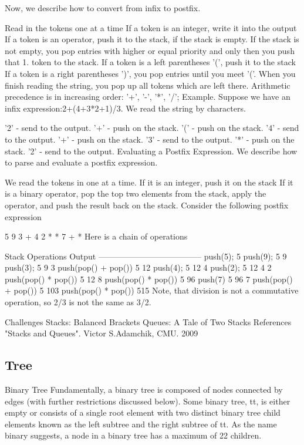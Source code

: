 Now, we describe how to convert from infix to postfix.

Read in the tokens one at a time
If a token is an integer, write it into the output
If a token is an operator, push it to the stack, if the stack is empty. If the stack is not empty, you pop entries with higher or equal priority and only then you push that 1. token to the stack.
If a token is a left parentheses '(', push it to the stack
If a token is a right parentheses ')', you pop entries until you meet '('.
When you finish reading the string, you pop up all tokens which are left there.
Arithmetic precedence is in increasing order: '+', '-', '*', '/';
Example. Suppose we have an infix expression:2+(4+3*2+1)/3. We read the string by characters.

'2' - send to the output.
'+' - push on the stack.
'(' - push on the stack.
'4' - send to the output.
'+' - push on the stack.
'3' - send to the output.
'*' - push on the stack.
'2' - send to the output.
Evaluating a Postfix Expression. We describe how to parse and evaluate a postfix expression.

We read the tokens in one at a time.
If it is an integer, push it on the stack
If it is a binary operator, pop the top two elements from the stack, apply the operator, and push the result back on the stack.
Consider the following postfix expression

5 9 3 + 4 2 * * 7 + *
Here is a chain of operations

Stack Operations              Output
--------------------------------------
push(5);                        5
push(9);                        5 9
push(3);                        5 9 3
push(pop() + pop())             5 12
push(4);                        5 12 4
push(2);                        5 12 4 2
push(pop() * pop())             5 12 8
push(pop() * pop())             5 96
push(7)                         5 96 7
push(pop() + pop())             5 103
push(pop() * pop())             515
Note, that division is not a commutative operation, so 2/3 is not the same as 3/2.

Challenges
Stacks: Balanced Brackets
Queues: A Tale of Two Stacks
References
"Stacks and Queues". Victor S.Adamchik, CMU. 2009

\subsection{Tree}

Binary Tree
Fundamentally, a binary tree is composed of nodes connected by edges (with further restrictions discussed below). Some binary tree, tt, is either empty or consists of a single root element with two distinct binary tree child elements known as the left subtree and the right subtree of tt. As the name binary suggests, a node in a binary tree has a maximum of 22 children.

